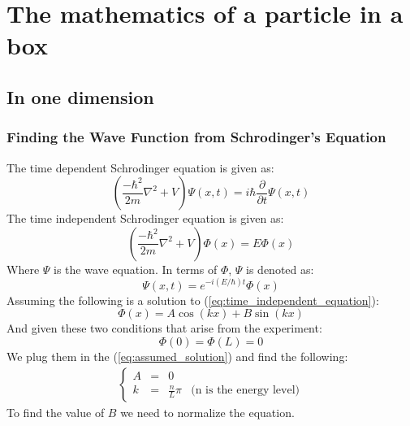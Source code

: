 \documentclass[a4paper, 10pt]{article}
\begin{document}
\newpage

\section{The mathematics of a particle in a box}
    \subsection{In one dimension}
        \subsubsection{Finding the Wave Function from Schrodinger's Equation}
        \label{sec:wave_equation_oned}
        The time dependent Schrodinger equation is given as:
        \begin{equation} \label{eq:time_dependant_equation}
            \left ( \frac{-\hbar^2}{2m} \nabla^2 + V \right ) \Psi(x,t)
            = i\hbar\frac{\partial}{\partial t}\Psi(x, t)   
        \end{equation}
        The time independent Schrodinger equation is given as:
        \begin{equation} \label{eq:time_independent_equation}
            \left ( \frac{-\hbar^2}{2m} \nabla^2 + V \right ) \Phi(x)
            = E \Phi(x)
        \end{equation}
        Where $\Psi$ is the wave equation. In terms of $\Phi$, $\Psi$ is
        denoted as:
        \begin{equation} \label{eq:dep_in_equation}
            \Psi(x, t) = e^{-i(E/\hbar)t}\Phi(x)
        \end{equation}
        Assuming the following is a solution to (\ref{eq:time_independent_equation}):
        \begin{equation} \label{eq:assumed_solution}
            \Phi(x) = A\cos(kx) + B\sin(kx)
        \end{equation}
        And given these two conditions that arise from the experiment:
        $$ \Phi(0) = \Phi(L) = 0 $$
        We plug them in the (\ref{eq:assumed_solution}) and find the following:
        \begin{align}
            \left\{\begin{matrix}
            A & = & 0 \\ 
            k & = & \frac{n}{L}\pi & \text{(n is the energy level)}
            \end{matrix}\right.
        \end{align}
        To find the value of $B$ we need to normalize the equation.\\
\end{document}
